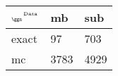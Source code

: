 \begin{tabular}{lll}
    \toprule
    $_{\text{\tiny{\ggn}}}$$^{\text{\tiny{Data}}}$ & mb & sub \\
    \midrule
    exact & 97
              & 703 \\
    mc   & 3783
              & 4929 \\
    \bottomrule
\end{tabular}